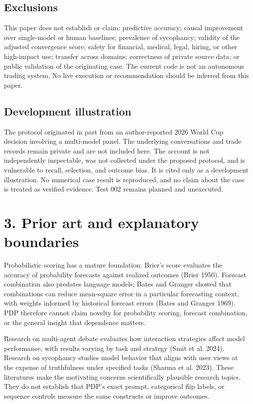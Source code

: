 \documentclass[
  english,
]{article}
\begin{document}
\subsection{Exclusions}\label{exclusions}

This paper does not establish or claim: predictive accuracy; causal
improvement over single-model or human baselines; prevalence of
sycophancy; validity of the adjusted convergence score; safety for
financial, medical, legal, hiring, or other high-impact use; transfer
across domains; correctness of private source data; or public validation
of the originating case. The current code is not an autonomous trading
system. No live execution or recommendation should be inferred from this
paper.

\subsection{Development illustration}\label{development-illustration}

The protocol originated in part from an author-reported 2026 World Cup
decision involving a multi-model panel. The underlying conversations and
trade records remain private and are not included here. The account is
not independently inspectable, was not collected under the proposed
protocol, and is vulnerable to recall, selection, and outcome bias. It
is cited only as a development illustration. No numerical case result is
reproduced, and no claim about the case is treated as verified evidence.
Test 002 remains planned and unexecuted.

\section{3. Prior art and explanatory
boundaries}\label{prior-art-and-explanatory-boundaries}

Probabilistic scoring has a mature foundation. Brier's score evaluates
the accuracy of probability forecasts against realized outcomes (Brier
1950). Forecast combination also predates language models; Bates and
Granger showed that combinations can reduce mean-square error in a
particular forecasting context, with weights informed by historical
forecast errors (Bates and Granger 1969). PDP therefore cannot claim
novelty for probability scoring, forecast combination, or the general
insight that dependence matters.

Research on multi-agent debate evaluates how interaction strategies
affect model performance, with results varying by task and strategy
(Smit et al. 2024). Research on sycophancy studies model behavior that
aligns with user views at the expense of truthfulness under specified
tasks ({Sharma et al.} 2023). These literatures make the motivating
concerns scientifically plausible research topics. They do not establish
that PDP's exact prompt, categorical flip labels, or sequence controls
measure the same constructs or improve outcomes.
\end{document}
